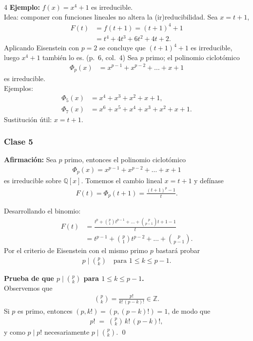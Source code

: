 \documentclass[landscape,a4paper]{article}
\begin{document}
\begin{multicols}{4}
\noindent \textbf{Ejemplo:} $f(x)=x^4+1$ es irreducible.\\
Idea: componer con funciones lineales no altera la (ir)reducibilidad.  
Sea $x = t+1$,
\begin{align*}
  F(t) &= f(t+1) = (t+1)^4 + 1 \\
       &= t^4 + 4t^3 + 6t^2 + 4t + 2.
\end{align*}
Aplicando Eisenstein con $p=2$ se concluye que $(t+1)^4+1$ es irreducible, luego $x^4+1$ también lo es. (p.~6, col.~4)
\noindent Sea $p$ primo; el polinomio ciclotómico
\begin{align*}
  \Phi_p(x) &= x^{p-1}+x^{p-2}+\dots + x + 1
\end{align*}
es irreducible.\\[0.3em]
Ejemplos:
\begin{align*}
  \Phi_5(x) &= x^4 + x^3 + x^2 + x + 1,\\
  \Phi_7(x) &= x^6 + x^5 + x^4 + x^3 + x^2 + x + 1.
\end{align*}
Sustitución útil: $x = t+1$.
\subsubsection*{Clase 5}
\noindent \textbf{Afirmación:} Sea $p$ primo, entonces el polinomio ciclotómico
\begin{align*}
  \Phi_p(x)=x^{p-1}+x^{p-2}+\dots +x+1
\end{align*}
es irreducible sobre $\mathbb{Q}[x]$.  
Tomemos el cambio lineal $x=t+1$ y defínase
\begin{align*}
  F(t)=\Phi_p(t+1)=\frac{(t+1)^p-1}{t}.
\end{align*}

Desarrollando el binomio:
\begin{align*}
  F(t)&=\frac{t^p+\binom{p}{1}t^{p-1}+\dots+\binom{p}{p-1}t+1-1}{t} \\
      &=t^{p-1}+ \binom{p}{1}t^{p-2}+\dots+\binom{p}{p-1}.
\end{align*}
Por el criterio de Eisenstein con el mismo primo $p$ bastará probar
\begin{align*}
  p\mid \binom{p}{k}\quad \text{para }1\le k\le p-1.
\end{align*}

\noindent \textbf{Prueba de que $p\mid\binom{p}{k}$ para $1\le k\le p-1$.}\\
Observemos que
\begin{align*}
  \binom{p}{k}=\frac{p!}{k!\,(p-k)!}\in\mathbb{Z}.
\end{align*}
Si $p$ es primo, entonces $(p,k!)=(p,(p-k)!)=1$, de modo que
\begin{align*}
  p!\;=\;\binom{p}{k}\,k!\,(p-k)!,
\end{align*}
y como $p\mid p!$ necesariamente $p\mid\binom{p}{k}$. \qed


\end{multicols}
\end{document}
